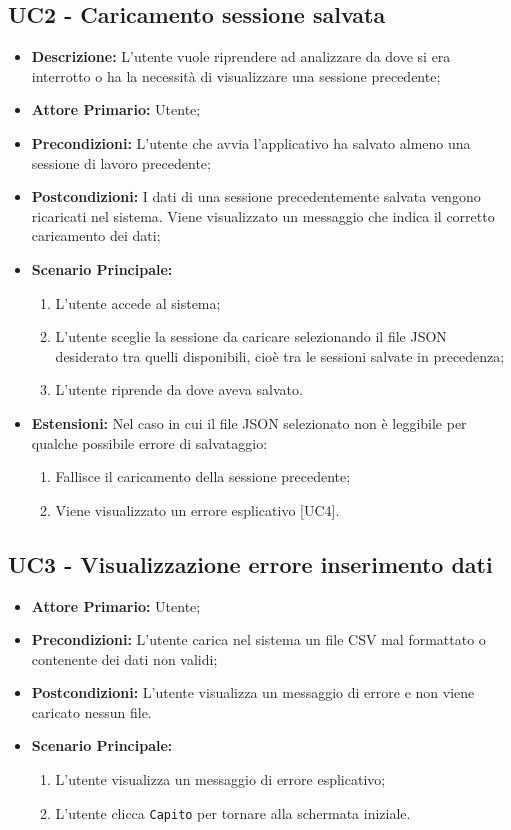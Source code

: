\subsection{UC2 - Caricamento sessione salvata}
\begin{itemize}
  \item \textbf{Descrizione:} L'utente vuole riprendere ad analizzare da dove si era interrotto
  o ha la necessità di visualizzare una sessione precedente;
  \item \textbf{Attore Primario:} Utente;
  \item \textbf{Precondizioni:} L'utente che avvia l'applicativo ha salvato almeno una sessione di lavoro precedente;
  \item \textbf{Postcondizioni:} I dati di una sessione precedentemente salvata vengono ricaricati nel sistema. Viene visualizzato un messaggio che indica il corretto caricamento dei dati;
  \item \textbf{Scenario Principale:}
  \begin{enumerate}
    \item L'utente accede al sistema;
    \item L'utente sceglie la sessione da caricare selezionando il file JSON desiderato tra quelli disponibili,
    cioè tra le sessioni salvate in precedenza;
    \item L'utente riprende da dove aveva salvato.
  \end{enumerate}
  \item \textbf{Estensioni:}
  Nel caso in cui il file JSON selezionato non è leggibile per qualche possibile errore di salvataggio:
    \begin{enumerate}
      \item Fallisce il caricamento della sessione precedente;
      \item Viene visualizzato un errore esplicativo [UC4].
    \end{enumerate}
\end{itemize}
\subsection{UC3 - Visualizzazione errore inserimento dati}
\begin{itemize}
  \item \textbf{Attore Primario:} Utente;
  \item \textbf{Precondizioni:} L'utente carica nel sistema un file CSV mal formattato o contenente dei dati non validi;
  \item \textbf{Postcondizioni:} L'utente visualizza un messaggio di errore e non viene caricato nessun file.
  \item \textbf{Scenario Principale:}
  \begin{enumerate}
    \item L'utente visualizza un messaggio di errore esplicativo;
    \item L'utente clicca \texttt{Capito} per tornare alla schermata iniziale.
  \end{enumerate}
\end{itemize}
